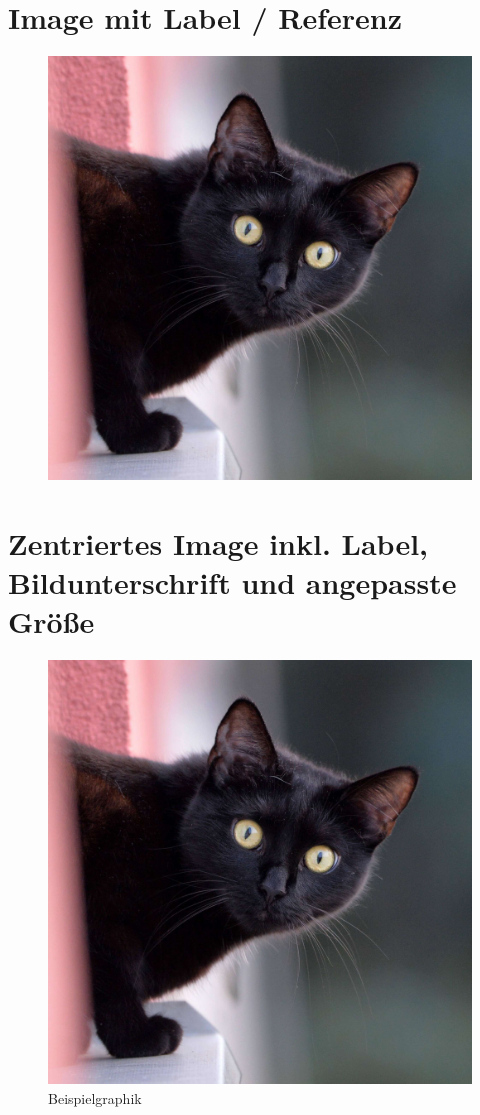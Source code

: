 \documentclass{scrarticle}
\begin{document}
	\section{Image mit Label / Referenz}
	\begin{figure}[h!hbt]
		\includegraphics[width=\linewidth]{./Abbildungen/Beispiel.jpg}
		\label{Abb: Beispiel1} %
	\end{figure}
	\newpage
	
	\section{Zentriertes Image inkl. Label, Bildunterschrift und angepasste Größe}
	\begin{figure}[h!hbt]
		\centering
		\includegraphics[width=0.8\linewidth]{./Abbildungen/Beispiel.jpg}
		\caption{Beispielgraphik}
		\label{Abb: Beispiel2}
	\end{figure}
	\newpage
	
\end{document}
